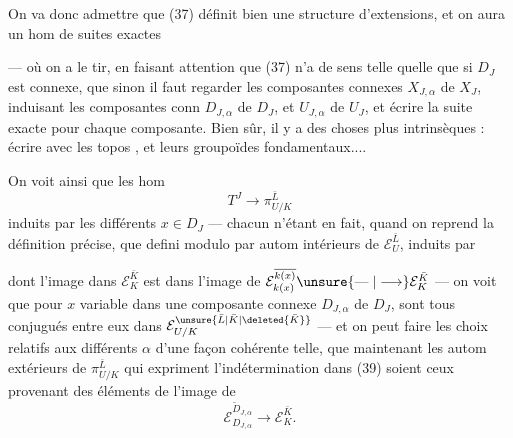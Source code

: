 

On va donc admettre que (37) définit bien une structure d'extensions, et on aura un hom de suites exactes


--- où on a  le tir, en faisant attention que (37) n'a de sens telle quelle que si $D_J$ est connexe,  que sinon il faut regarder les composantes connexes $X_{J,\alpha}$ de $X_J$, induisant les composantes conn $D_{J,\alpha}$ de $D_J$, et $U_{J,\alpha}$ de $U_J$, et écrire la suite exacte pour chaque composante. Bien sûr, il y a des choses plus intrinsèques : écrire avec les topos , et leurs groupoïdes fondamentaux....

On voit ainsi que les hom
\[
\tag{39}
T^J\longrightarrow\pi_{U/K}^{\bar L}
\]
induits par les différents $x\in D_J$ --- chacun n'étant en fait, quand on reprend la définition précise, que defini modulo   par autom intérieurs de $\mathcal E_U^{\bar L}$, induits par



 dont l'image dans $\mathcal E_K^{\bar K}$ est dans l'image de $\mathcal E_{k(x)}^{\overline{k(x)}}\unsure{\mathrel{\text{---}}|\longrightarrow}\mathcal E_K^{\bar K}$ --- on voit que pour $x$ variable dans une composante connexe $D_{J,\alpha}$ de $D_J$, sont tous conjugués entre eux dans $\mathcal E_{U/K}^{\unsure{\bar L|\bar K|\deleted{\bar K}}}$ --- et on peut faire les choix relatifs aux différents $\alpha$ d'une façon cohérente telle, que maintenant les autom extérieurs de $\pi_{U/K}^{\bar L}$ qui expriment l'indétermination dans (39) soient ceux provenant des éléments de l'image de
\[
\mathcal E_{D_{J,\alpha}}^{\tilde D_{J,\alpha}}\longrightarrow\mathcal E_K^{\bar K}.
\]

